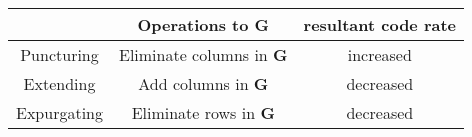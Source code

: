 \begin{table}[h]
\centering
\begin{tabular}{|c|c|c|}
\hline
            & Operations to $\mathbf{G}$         & resultant code rate \\ \hline
Puncturing  & Eliminate columns in $\mathbf{G}$ & increased           \\ \hline
Extending   & Add columns in $\mathbf{G}$       & decreased           \\ \hline
Expurgating & Eliminate rows in $\mathbf{G}$    & decreased           \\ \hline
\end{tabular}
\end{table}
